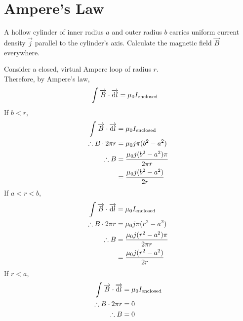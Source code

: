 \documentclass[fleqn, a4paper, 12pt, twoside]{article}
\theoremstyle{definition}
\theoremstyle{theorem}
\begin{document}
\section{Ampere's Law}

\begin{question}
	A hollow cylinder of inner radius $a$ and outer radius $b$ carries uniform current density ⃗$\overrightarrow{j}$ parallel to the cylinder's axis.
	Calculate the magnetic field $\overrightarrow{B}$ everywhere.
\end{question}

\begin{solution}
	Consider a closed, virtual Ampere loop of radius $r$.\\
	Therefore, by Ampere's law,
	\begin{align*}
		\int \overrightarrow{B} \cdot \overrightarrow{\dif l} & = \mu_0 I_{\textnormal{enclosed}}
	\end{align*}
	If $b < r$,
	\begin{align*}
		\int \overrightarrow{B} \cdot \overrightarrow{\dif l} & = \mu_0 I_{\textnormal{enclosed}}         \\
		\therefore B \cdot 2 \pi r                            & = \mu_0 j \pi (b^2 - a^2)                 \\
		\therefore B                                          & = \frac{\mu_0 j (b^2 - a^2) \pi}{2 \pi r} \\
                                                                      & = \frac{\mu_0 j (b^2 - a^2)}{2 r}
	\end{align*}
	If $a < r < b$,
	\begin{align*}
		\int \overrightarrow{B} \cdot \overrightarrow{\dif l} & = \mu_0 I_{\textnormal{enclosed}}         \\
		\therefore B \cdot 2 \pi r                            & = \mu_0 j \pi (r^2 - a^2)                 \\
		\therefore B                                          & = \frac{\mu_0 j (r^2 - a^2) \pi}{2 \pi r} \\
                                                                      & = \frac{\mu_0 j (r^2 - a^2)}{2 r}
	\end{align*}
	If $r < a$,
	\begin{align*}
		\int \overrightarrow{B} \cdot \overrightarrow{\dif l} & = \mu_0 I_{\textnormal{enclosed}} \\
		\therefore B \cdot 2 \pi r                            & = 0                               \\
		\therefore B                                          & = 0
	\end{align*}
\end{solution}
\end{document}
